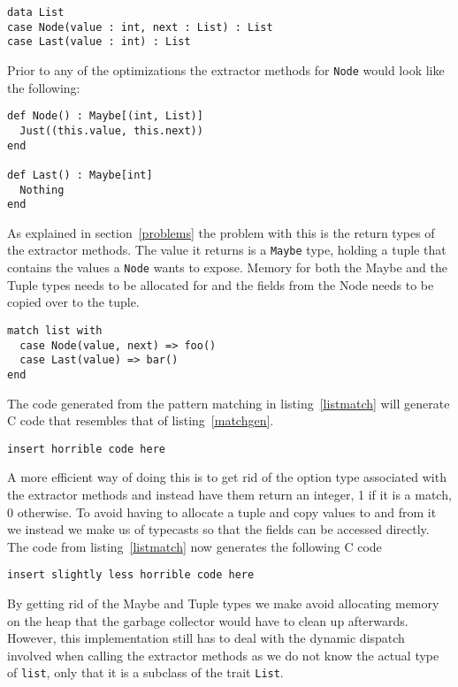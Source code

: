 \documentclass[10pt]{report}
\def\code#1{\texttt{#1}} %
\begin{document}
{\begin{lstlisting}[language=encore]
data List
case Node(value : int, next : List) : List
case Last(value : int) : List
\end{lstlisting}

\par{Prior to any of the optimizations the extractor methods for \code{Node} would look like the following:}

\begin{lstlisting}[language=encore,caption={Extractor methods before optimization}]
def Node() : Maybe[(int, List)]
  Just((this.value, this.next))
end

def Last() : Maybe[int]
  Nothing
end
\end{lstlisting}

\par{As explained in section~\ref{problems} the problem with this is the return types of the extractor methods. The value it returns is a \code{Maybe} type, holding a tuple that contains the values a \code{Node} wants to expose. Memory for both the Maybe and the Tuple types needs to be allocated for and the fields from the Node needs to be copied over to the tuple.}


\begin{lstlisting}[language=encore,caption={Pattern matching on a List},label=listmatch]
match list with
  case Node(value, next) => foo()
  case Last(value) => bar()
end
\end{lstlisting}

\par{The code generated from the pattern matching in listing~\ref{listmatch} will generate C code that resembles that of listing~\ref{matchgen}.}


\begin{lstlisting}[language=encore,caption={Pattern matching on a List},label=matchgen]
  insert horrible code here
\end{lstlisting}

\par{A more efficient way of doing this is to get rid of the option type associated with the extractor methods and instead have them return an integer, 1 if it is a match, 0 otherwise. To avoid having to allocate a tuple and copy values to and from it we instead we make us of typecasts so that the fields can be accessed directly. The code from listing~\ref{listmatch} now generates the following C code}

\begin{lstlisting}[language=encore,caption={Pattern matching on a List},label=matchgen2]
  insert slightly less horrible code here
\end{lstlisting}
\par{By getting rid of the Maybe and Tuple types we make avoid allocating memory on the heap that the garbage collector would have to clean up afterwards. However, this implementation still has to deal with the dynamic dispatch involved when calling the extractor methods as we do not know the actual type of \code{list}, only that it is a subclass of the trait \code{List}.}

}
\end{document}
